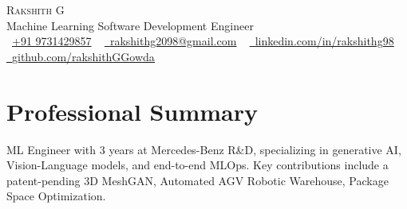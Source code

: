 \documentclass[letterpaper,8pt]{article}
\begin{document}

\begin{center}
    {\Huge \scshape Rakshith G} \\ \vspace{1pt}
    Machine Learning Software Development Engineer \\ \vspace{1pt}
    \small \raisebox{-0.1\height}\faPhone\  \underline{+91 9731429857} ~ \href{mailto:rakshithg2098@gmail.com}{\raisebox{-0.2\height}\faEnvelope\  \underline{rakshithg2098@gmail.com}} ~
    \href{https://www.linkedin.com/in/rakshithg98/}{\raisebox{-0.2\height}\faLinkedin\ \underline{linkedin.com/in/rakshithg98}}  ~
    \href{https://github.com/rakshithGGowda}{\raisebox{-0.2\height}\faGithub\ \underline{github.com/rakshithGGowda}}
    \vspace{-2pt}
\end{center}


\section{Professional Summary}
  \begin{itemize}[leftmargin=0.15in, label={}]
    \small{\item{
      ML Engineer with 3 years at Mercedes-Benz R\&D, specializing in generative AI, Vision-Language models, and end-to-end MLOps. Key contributions include a patent-pending 3D MeshGAN, Automated AGV Robotic Warehouse, Package Space Optimization.
    }}
  \end{itemize}
  \vspace{-16pt}


\end{document}
